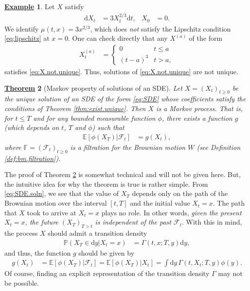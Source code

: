 \documentclass[12pt]{book}
\let\varphi\phi
\numberwithin{equation}{chapter}
\theoremstyle{plain}
\newtheorem{theorem}{\underline{Theorem}}
\numberwithin{theorem}{section}
\theoremstyle{definition}
\newtheorem{example}[theorem]{\underline{Example}}
\numberwithin{exercise}{chapter}
\newcommand{\<}{\langle}
\renewcommand{\>}{\rangle}
\renewcommand{\(}{\left(}
\renewcommand{\)}{\right)}
\renewcommand{\[}{\left[}
\renewcommand{\]}{\right]}
\newcommand\Eb{\mathds{E}}
\newcommand\Fb{\mathds{F}}
\newcommand\Pb{\mathds{P}}
\newcommand\Fc{\mathscr{F}}
\newcommand\Gam{\Gamma}
\newcommand\dd{\mathrm{d}}
\begin{document}
\begin{example}
Let $X$ satisfy
\begin{align}
\dd X_t
	&=	3 X_t^{2/3} \dd t , &
X_0
	&=	0 . \label{eq:X.not.unique}
\end{align}
We identify $\mu(t,x) = 3 x^{2/3}$, which does \emph{not} satisfy the Lipschitz condition \eqref{eq:lipschitz} at $x=0$.  One can check directly that any $X^{(a)}$ of the form
\begin{align}
X_t^{(a)}
	&=	\left\{ \begin{array}{ll}
			0 & t \leq a \\
			(t-a)^3 & t > a ,
			\end{array} \right.
\end{align}
satisfies \eqref{eq:X.not.unique}.  Thus, solutions of \eqref{eq:X.not.unique} are not unique.
\end{example}

\begin{theorem}[Markov property of solutions of an SDE]
\label{thm:Markov.prop}
Let $X = (X_t)_{t \geq 0}$ be the unique solution of an SDE of the form \eqref{eq:SDE} whose coefficients satisfy the conditions of Theorem \ref{thm:exist.unique}.  Then $X$ is a Markov process.  That is, for $t \leq T$ and for any bounded measurable function $\varphi$, there exists a function $g$ (which depends on $t$, $T$ and $\varphi$) such that
\begin{align}
\Eb[ \varphi( X_T ) | \Fc_t ]
	&=	g(X_t) ,
\end{align}
where $\Fb=(\Fc_t)_{t \geq 0}$ is a filtration for the Brownian motion $W$ (see Definition \ref{def:bm.filtration}).
\end{theorem}

\noindent
The proof of Theorem \ref{thm:Markov.prop} is somewhat technical and will not be given here.  But, the intuitive idea for why the theorem is true is rather simple.
From \eqref{eq:SDE.soln}, we see that the value of $X_T$  depends only on the path of the Brownian motion over the interval $[t,T]$ and the initial value $X_t = x$.
The path that $X$ took to arrive at $X_t = x$ plays no role.  In other words, \emph{given the present $X_t = x$, the future $(X_T)_{T>t}$ is independent of the past $\Fc_t$}.  With this in mind, the process $X$ should admit a transition density
\begin{align}
\Pb( X_T \in \dd y | X_t = x)
	&=	\Gam(t,x;T,y) \dd y ,
\end{align}
and thus, the function $g$ should be given by
\begin{align}
g(X_t)
	&=	\Eb [ \varphi( X_T ) | \Fc_t ]
	=		\Eb [ \varphi( X_T ) | X_t ]
	=		\int \dd y \, \Gam(t,X_t;T,y) \varphi( y ) .
\end{align}
Of course, finding an explicit representation of the transition density $\Gam$ may not be possible.
\end{document}
